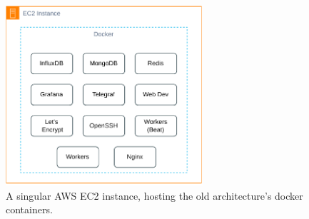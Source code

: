 \begin{figure}[!htbp]
    \centering
    \includegraphics[width=0.65\textwidth]{img/diagrams/pdf/old-arch.drawio.pdf}
    \caption[AWS EC2 Instance Overview]{A singular AWS EC2 instance, hosting the old architecture's docker containers.}
    \label{fig:old-arch.drawio.pdf}
\end{figure}
    